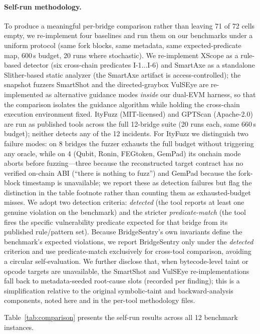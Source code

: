 \documentclass[journal]{IEEEtran}
\begin{document}
\paragraph{Self-run methodology.}
To produce a meaningful per-bridge comparison rather than leaving 71 of 72 cells empty, we re-implement four baselines and run them on our benchmarks under a uniform protocol (same fork blocks, same metadata, same expected-predicate map, 600\,s budget, 20 runs where stochastic). We re-implement XScope as a rule-based detector (six cross-chain predicates I-1$\ldots$I-6) and SmartAxe as a standalone Slither-based static analyzer (the SmartAxe artifact is access-controlled); the snapshot fuzzers SmartShot and the directed-graybox VulSEye are re-implemented as alternative guidance modes \emph{inside} our dual-EVM harness, so that the comparison isolates the guidance algorithm while holding the cross-chain execution environment fixed. ItyFuzz (MIT-licensed) and GPTScan (Apache-2.0) are run as published tools across the full 12-bridge suite (20 runs each, same 660\,s budget); neither detects any of the 12 incidents. For ItyFuzz we distinguish two failure modes: on 8 bridges the fuzzer exhausts the full budget without triggering any oracle, while on 4 (Qubit, Ronin, FEGtoken, GemPad) its onchain mode aborts before fuzzing---three because the reconstructed target contract has no verified on-chain ABI (``there is nothing to fuzz'') and GemPad because the fork-block timestamp is unavailable; we report these as detection failures but flag the distinction in the table footnote rather than counting them as exhausted-budget misses. We adopt two detection criteria: \emph{detected} (the tool reports at least one genuine violation on the benchmark) and the stricter \emph{predicate-match} (the tool fires the specific vulnerability predicate expected for that bridge from its published rule/pattern set). Because BridgeSentry's own invariants define the benchmark's expected violations, we report BridgeSentry only under the \emph{detected} criterion and use predicate-match exclusively for cross-tool comparison, avoiding a circular self-evaluation. We further disclose that, when bytecode-level taint or opcode targets are unavailable, the SmartShot and VulSEye re-implementations fall back to metadata-seeded root-cause slots (recorded per finding); this is a simplification relative to the original symbolic-taint and backward-analysis components, noted here and in the per-tool methodology files.

Table~\ref{tab:comparison} presents the self-run results across all 12 benchmark instances.
\end{document}
